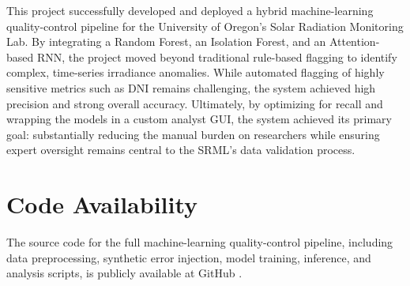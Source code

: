 \documentclass[12pt]{article}
\begin{document}
This project successfully developed and deployed a hybrid machine-learning quality-control pipeline for the University of Oregon's Solar Radiation Monitoring Lab. By integrating a Random Forest, an Isolation Forest, and an Attention-based RNN, the project moved beyond traditional rule-based flagging to identify complex, time-series irradiance anomalies. While automated flagging of highly sensitive metrics such as DNI remains challenging, the system achieved high precision and strong overall accuracy. Ultimately, by optimizing for recall and wrapping the models in a custom analyst GUI, the system achieved its primary goal: substantially reducing the manual burden on researchers while ensuring expert oversight remains central to the SRML's data validation process.

\section*{Code Availability}
The source code for the full machine-learning quality-control pipeline, including data preprocessing, synthetic error injection, model training, inference, and analysis scripts, is publicly available at GitHub \cite{chester2026srmlmlqc}.

\pagebreak 
\end{document}
